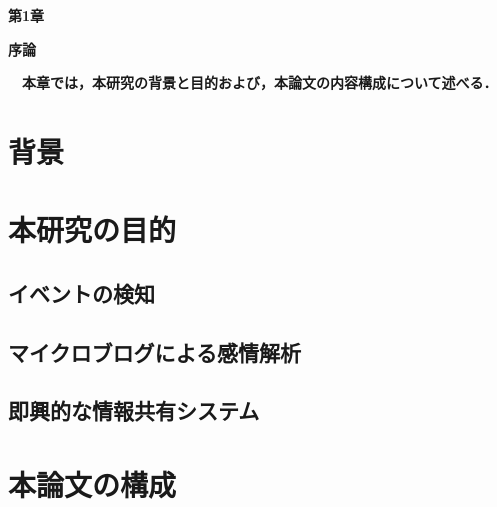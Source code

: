 \setcounter{chapter}{1}
\setcounter{section}{0}

\begin{center}
\vspace{0.5cm}
\huge{\bf 第1章}
\par
\vspace{1cm}
\hrulefill
\par
\vspace{1cm}
\huge{\bf 序論}
\par
\vspace{0.5cm}
\hrulefill
\vspace{1cm}
\par

\begin{flushleft}
\large{{\bf　本章では，本研究の背景と目的および，本論文の内容構成について述べる．}}
\end{flushleft}
\end{center}


\newpage

\section{背景}

\newpage

\section{本研究の目的}
\subsection{イベントの検知}

\newpage

\subsection{マイクロブログによる感情解析}

\newpage

\subsection{即興的な情報共有システム}

\section{本論文の構成}
